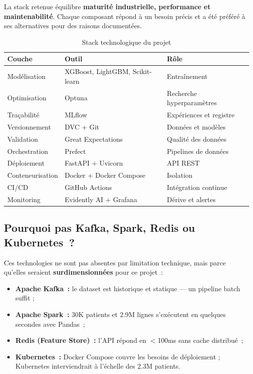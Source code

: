 La stack retenue équilibre \textbf{maturité industrielle, performance et
maintenabilité}. Chaque composant répond à un besoin précis et a été préféré
à ses alternatives pour des raisons documentées.

\begin{table}[htbp]
\centering
\caption{Stack technologique du projet}
\label{tab:stack}
\begin{tabular}{@{}lll@{}}
\toprule
\textbf{Couche} & \textbf{Outil} & \textbf{Rôle} \\
\midrule
Modélisation      & XGBoost, LightGBM, Scikit-learn & Entraînement \\
Optimisation      & Optuna                          & Recherche hyperparamètres \\
Traçabilité       & MLflow                          & Expériences et registre \\
Versionnement     & DVC + Git                       & Données et modèles \\
Validation        & Great Expectations              & Qualité des données \\
Orchestration     & Prefect                         & Pipelines de données \\
Déploiement       & FastAPI + Uvicorn               & API REST \\
Conteneurisation  & Docker + Docker Compose         & Isolation \\
CI/CD             & GitHub Actions                  & Intégration continue \\
Monitoring        & Evidently AI + Grafana          & Dérive et alertes \\
\bottomrule
\end{tabular}
\end{table}

\subsection{Pourquoi pas Kafka, Spark, Redis ou Kubernetes~?}

\begin{alertbox}
Ces technologies ne sont pas absentes par limitation technique, mais parce
qu'elles seraient \textbf{surdimensionnées} pour ce projet~:
\begin{itemize}
  \item \textbf{Apache Kafka~:} le dataset est historique et statique --- un
        pipeline batch suffit ;
  \item \textbf{Apache Spark~:} 30K patients et 2.9M lignes s'exécutent en
        quelques secondes avec Pandas~;
  \item \textbf{Redis (Feature Store)~:} l'API répond en $<$100ms sans cache
        distribué~;
  \item \textbf{Kubernetes~:} Docker Compose couvre les besoins de déploiement ;
        Kubernetes interviendrait à l'échelle des 2.3M patients.
\end{itemize}
\end{alertbox}

